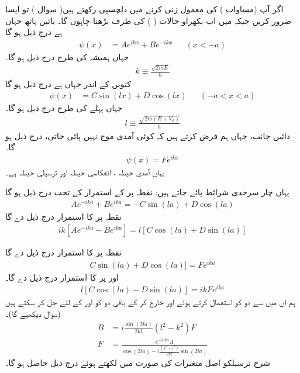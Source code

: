  اگر آپ  (مساوات ) کی معمول زنی کرنے میں دلچسپی رکھتے ہیں( سوال ) تو ایسا ضرور کریں جبکہ میں اب بکھراو حالات ( ) کی طرف بڑھنا چاہوں گا۔ بائیں ہاتھ جہاں ہے درج ذیل ہو گا 
\begin{align}
\psi(x)&=Ae^{i k x}+Be^{-i k x} && (x<-a) 
\end{align}
 جہاں ہمیشہ کی طرح درج ذیل ہو گا۔
 \begin{align}
 k\equiv \frac{\sqrt{2mE}}{\hslash} 
 \end{align} 
 کنویں کے اندر جہاں ہے درج ذیل ہو گا
\begin{align}
\psi(x)&=C\sin(lx)+D\cos(lx)&& (-a<x<a)
 \end{align}
 جہاں پہلے کی طرح درج ذیل ہو گا۔
 \begin{align}
 l\equiv \frac{\sqrt{2m(E+V_{0})}}{\hslash}
 \end{align}
 دائیں جانب، جہاں ہم فرض کرتے ہیں کہ کوئی آمدی موج نہیں پائی جاتی، درج ذیل ہو گا۔
 \begin{align}
 \psi(x)=Fe^{i k x} 
 \end{align}
 یہاں آمدی حیطہ ، انعکاسی حیطہ  اور ترسیلی حیطہ  ہے۔ 
 
 یہاں چار سرحدی شرائط پائے جاتے ہیں: نقطہ  پر  کے استمرار کے تحت درج ذیل ہو گا
\begin{align}\label{مساوات_شروڈنگر_اے}
Ae^{-ika}+Be^{ika} = -C\sin(la)+D\cos(la)
 \end{align}
نقطہ پر کا استمرار درج ذیل دے گا
\begin{align}\label{مساوات_شروڈنگر_اے_بی}
ik[Ae^{-ika}-Be^{ika}] =l[C\cos(la)+D\sin(la)] 
\end{align}

نقطہ  پر کا استمرار درج ذیل دے گا 
\begin{align}\label{مساوات_شروڈنگر_سی}
C\sin (la)+D\cos(la)]=Fe^{ika} 
\end{align}
اور  پر کا استمرار درج ذیل دے گا۔
\begin{align}\label{مساوات_شروڈنگر_ڈی}
l[C\cos(la)-D\sin(la)]=ikFe^{ika} 
\end{align}
 ہم ان میں سے دو کو استعمال کرتے ہوئے  اور  خارج کر کے باقی دو کو اور  کے لئے حل کر سکتے ہیں (سوال  دیکھیے گا)۔
\begin{align}
B&=i\frac{\sin(2la)}{2kl}(l^{2}-k^{2})F \label{مساوات_شروڈنگر_بی}\\
F&=\frac{e^{-2ika}A}{\cos(2la)-i\frac{(k^{2}+l^{2})}{2kl}\sin(2la)}\label{مساوات_شروڈنگر_ایف}
\end{align}
 شرح ترسیلکو اصل متغیرات کی صورت میں لکھتے ہوئے درج ذیل حاصل ہو گا۔

